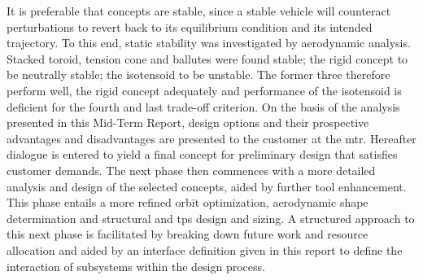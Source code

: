 \newline
\newline
It is preferable that concepts are stable, since a stable vehicle will counteract perturbations to revert back to its equilibrium condition and its intended trajectory. To this end, static stability was investigated by aerodynamic analysis. Stacked toroid, tension cone and ballutes were found stable; the rigid concept to be neutrally stable; the isotensoid to be unstable. The former three therefore perform well, the rigid concept adequately and performance of the isotensoid is deficient for the fourth and last trade-off criterion.
\newline
\newline
On the basis of the analysis presented in this Mid-Term Report, design options and their prospective advantages and disadvantages are presented to the customer at the \gls{mtr}. Hereafter dialogue is entered to yield a final concept for preliminary design that satisfies customer demands. The next phase then commences with a more detailed analysis and design of the selected concepts, aided by further tool enhancement. This phase entails a more refined orbit optimization, aerodynamic shape determination and structural and \gls{tps} design and sizing. A structured approach to this next phase is facilitated by breaking down future work and resource allocation and aided by an interface definition given in this report to define the interaction of subsystems within the design process.
